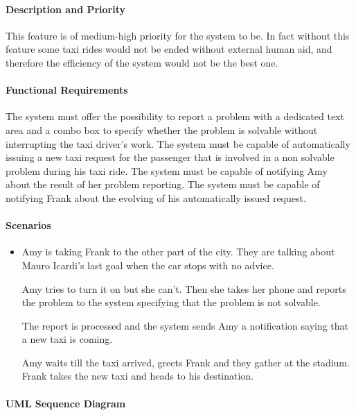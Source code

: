 \paragraph{Description and Priority}
This feature is of medium-high priority for the system to be. In fact without this feature some taxi rides would not be ended without external human aid, and therefore the efficiency of the system would not be the best one.
\paragraph{Functional Requirements}
\begin{itemize}
	 The system must offer the possibility to report a problem with a dedicated text area and a combo box to specify whether the problem is solvable without interrupting the taxi driver's work.
	 The system must be capable of automatically issuing a new taxi request for the passenger that is involved in a non solvable problem during his taxi ride.
	 The system must be capable of notifying Amy about the result of her problem reporting.
	 The system must be capable of notifying Frank about the evolving of his automatically issued request.
\end{itemize} 
\paragraph{Scenarios}
\begin{itemize}
	\item Amy is taking Frank to the other part of the city. They are talking about Mauro Icardi's last goal when the car stops with no advice. \par Amy tries to turn it on but she can't. Then she takes her phone and reports the problem to the system specifying that the problem is not solvable. \par The report is processed and the system sends Amy a notification saying that a new taxi is coming. \par Amy waits till the taxi arrived, greets Frank and they gather at the stadium. Frank takes the new taxi and heads to his destination.
\end{itemize}
\paragraph{UML Sequence Diagram}

